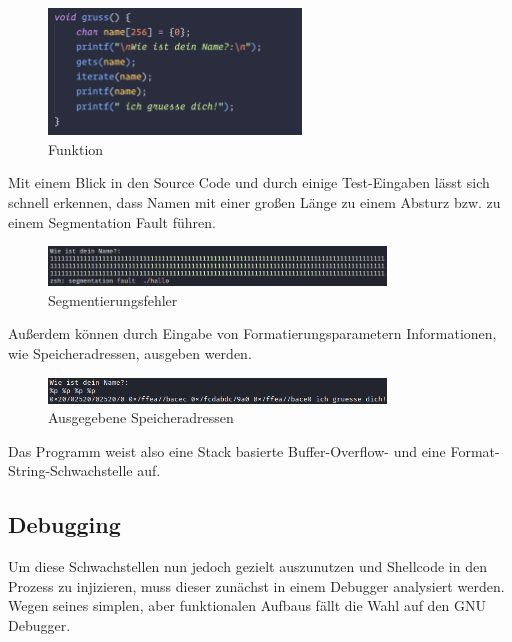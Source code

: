 \begin{figure}[h]
    \centering
    \includegraphics[width=0.6\textwidth,height=0.75\textheight,keepaspectratio]{images/gruss.png}
    \caption{Funktion }
\end{figure}
Mit einem Blick in den Source Code und durch einige Test-Eingaben lässt sich schnell erkennen,
dass Namen mit einer großen Länge zu einem Absturz bzw. zu einem Segmentation Fault führen.

\begin{figure}[h]
    \centering
    \includegraphics[width=0.8\textwidth,height=0.75\textheight,keepaspectratio]{images/segfault.png}
    \caption{Segmentierungsfehler}
\end{figure}

Außerdem können durch Eingabe von Formatierungsparametern Informationen, wie Speicheradressen, ausgeben werden.

\begin{figure}[h]
    \centering
    \includegraphics[width=0.8\textwidth,height=0.75\textheight,keepaspectratio]{images/adressen.png}
    \caption{Ausgegebene Speicheradressen}
\end{figure}

Das Programm weist also eine Stack basierte Buffer-Overflow- und eine Format-String-Schwachstelle auf.

\subsection{Debugging}

Um diese Schwachstellen nun jedoch gezielt auszunutzen und Shellcode in den Prozess zu injizieren,
muss dieser zunächst in einem Debugger analysiert werden. Wegen seines simplen, aber funktionalen Aufbaus
fällt die Wahl auf den GNU Debugger.

